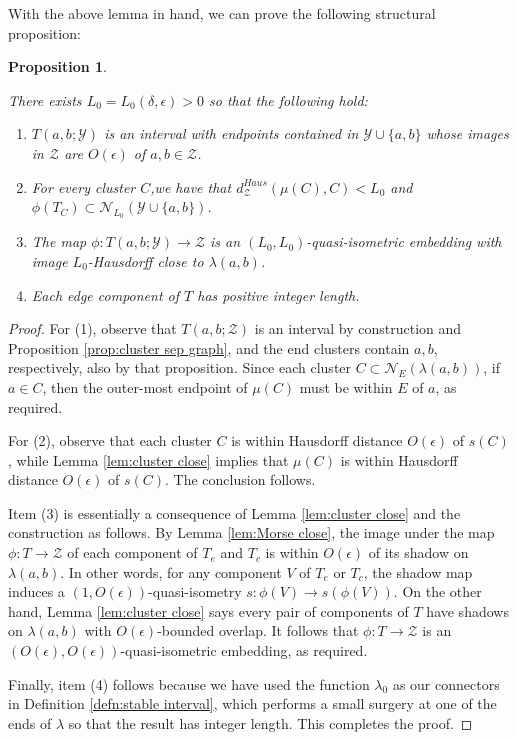 \documentclass{amsart}
\newtheorem{proposition}[theorem]{Proposition}
\theoremstyle{definition}
\theoremstyle{remark}
\theoremstyle{definition}
\newcommand{\calN}{\mathcal{N}}
\newcommand{\calY}{\mathcal{Y}}
\newcommand{\calZ}{\mathcal{Z}}
\begin{document}
With the above lemma in hand, we can prove the following structural proposition:                                                                                                                                                                                                                      
 
 \begin{proposition}\label{prop:stable interval structure}
 
There exists $L_0 = L_0(\delta, \epsilon)>0$ so that the following hold:

\begin{enumerate}
\item $T(a,b;\calY)$ is an interval with endpoints contained in $\calY \cup \{a,b\}$ whose images in $\calZ$ are $O(\epsilon)$ of $a,b \in \calZ$.
\item For every cluster $C$,we have that $d_{\calZ}^{Haus}(\mu(C), C) < L_0$ and $\phi(T_C) \subset \calN_{L_0}(\calY \cup \{a,b\})$. 
\item The map $\phi:T(a,b;\calY) \to \calZ$ is an $(L_0,L_0)$-quasi-isometric embedding with image $L_0$-Hausdorff close to $\lambda(a,b)$.
\item Each edge component of $T$ has positive integer length.
\end{enumerate}
 \end{proposition}
 
 \begin{proof}
 
 For (1), observe that $T(a,b;\calZ)$ is an interval by construction and Proposition \ref{prop:cluster sep graph}, and the end clusters contain $a,b$, respectively, also by that proposition.  Since each cluster $C \subset \calN_{E}(\lambda(a,b))$, if $a \in C$, then the outer-most endpoint of $\mu(C)$ must be within $E$ of $a$, as required.
 
 For (2), observe that each cluster $C$ is within Hausdorff distance $O(\epsilon)$ of $s(C)$, while Lemma \ref{lem:cluster close} implies that $\mu(C)$ is within Hausdorff distance $O(\epsilon)$ of $s(C)$.  The conclusion follows.
 
 Item (3) is essentially a consequence of Lemma \ref{lem:cluster close} and the construction as follows.  By Lemma \ref{lem:Morse close}, the image under the map $\phi:T \to \calZ$ of each component of $T_e$ and $T_c$ is within $O(\epsilon)$ of its shadow on $\lambda(a,b)$.  In other words, for any component $V$ of $T_e$ or $T_c$, the shadow map induces a $(1,O(\epsilon))$-quasi-isometry $s:\phi(V) \to s(\phi(V))$.  On the other hand, Lemma \ref{lem:cluster close} says every pair of components of $T$ have shadows on $\lambda(a,b)$ with $O(\epsilon)$-bounded overlap.  It follows that $\phi:T \to \calZ$ is an $(O(\epsilon), O(\epsilon))$-quasi-isometric embedding, as required.
 
 Finally, item (4) follows because we have used the function $\lambda_0$ as our connectors in Definition \ref{defn:stable interval}, which performs a small surgery at one of the ends of $\lambda$ so that the result has integer length.  This completes the proof.
\end{proof}
\end{document}
